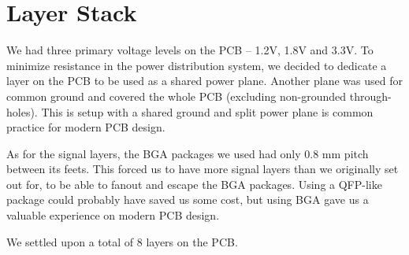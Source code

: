 \section{Layer Stack}

We had three primary voltage levels on the PCB -- 1.2V, 1.8V and 3.3V. To
minimize resistance in the power distribution system, we decided to dedicate a
layer on the PCB to be used as a shared power plane. Another plane was used for
common ground and covered the whole PCB (excluding non-grounded through-holes).
This is setup with a shared ground and split power plane is common practice for
modern PCB design.

As for the signal layers, the BGA packages we used had only 0.8 mm pitch between
its feets. This forced us to have more signal layers than we originally set out
for, to be able to fanout and escape the BGA packages. Using a QFP-like package
could probably have saved us some cost, but using BGA gave us a valuable
experience on modern PCB design.

We settled upon a total of 8 layers on the PCB.
